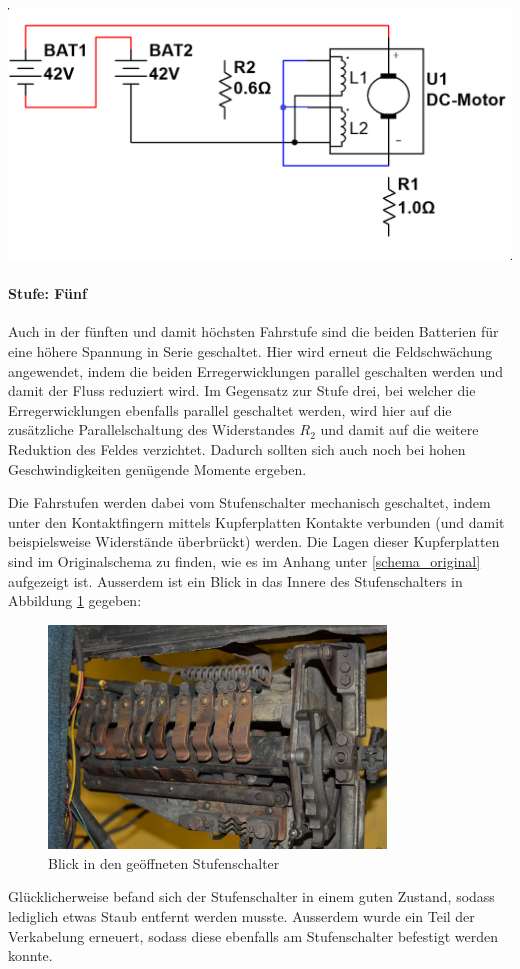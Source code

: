 \begin{minipage}{0.49\textwidth}
	\includegraphics[width=\columnwidth]{images/Stufenschalter/Stufe_5.png}%
\end{minipage}
\begin{minipage}{0.5\textwidth}
	\paragraph{Stufe: Fünf}
	Auch in der fünften und damit höchsten Fahrstufe sind die beiden Batterien für eine höhere Spannung in Serie geschaltet. Hier wird erneut die Feldschwächung angewendet, indem die beiden Erregerwicklungen parallel geschalten werden und damit der Fluss reduziert wird. Im Gegensatz zur Stufe drei, bei welcher die Erregerwicklungen ebenfalls parallel geschaltet werden, wird hier auf die zusätzliche Parallelschaltung des Widerstandes $R_2$ und damit auf die weitere Reduktion des Feldes verzichtet. Dadurch sollten sich auch noch bei hohen Geschwindigkeiten genügende Momente ergeben.
\end{minipage}

Die Fahrstufen werden dabei vom Stufenschalter mechanisch geschaltet, indem unter den Kontaktfingern mittels Kupferplatten Kontakte verbunden (und damit beispielsweise Widerstände überbrückt) werden. Die Lagen dieser Kupferplatten sind im Originalschema zu finden, wie es im Anhang unter \ref{schema_original} aufgezeigt ist. Ausserdem ist ein Blick in das Innere des Stufenschalters in Abbildung \ref{fig:Stufenschalter} gegeben:

\begin{figure}[h]
	\centering
		\includegraphics[width=0.8\textwidth]{images/Stufenschalter/Foto}
	\caption{Blick in den geöffneten Stufenschalter}
	\label{fig:Stufenschalter}
\end{figure}

Glücklicherweise befand sich der Stufenschalter in einem guten Zustand, sodass lediglich etwas Staub entfernt werden musste. Ausserdem wurde ein Teil der Verkabelung erneuert, sodass diese ebenfalls am Stufenschalter befestigt werden konnte.

\newpage